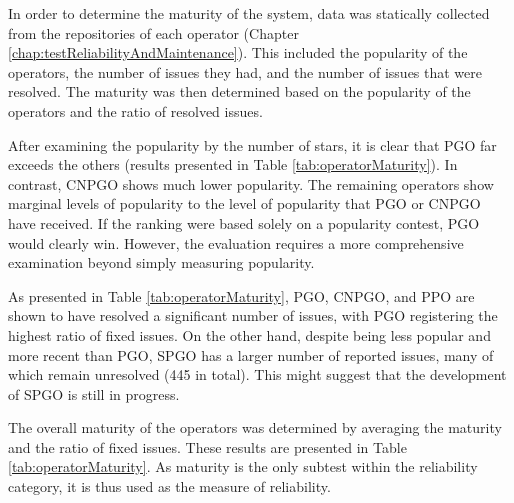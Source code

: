 
In order to determine the maturity of the system, data was statically collected from the repositories of each operator (Chapter \ref{chap:testReliabilityAndMaintenance}).
This included the popularity of the operators, the number of issues they had, and the number of issues that were resolved.
The maturity was then determined based on the popularity of the operators and the ratio of resolved issues.

After examining the popularity by the number of stars, it is clear that PGO far exceeds the others (results presented in Table \ref{tab:operatorMaturity}). In contrast, CNPGO shows much lower popularity.
The remaining operators show marginal levels of popularity to the level of popularity that PGO or CNPGO have received.
If the ranking were based solely on a popularity contest, PGO would clearly win. However, the evaluation requires a more comprehensive examination beyond simply measuring popularity.

As presented in Table \ref{tab:operatorMaturity}, PGO, CNPGO, and PPO are shown to have resolved a significant number of issues, with PGO registering the highest ratio of fixed issues. On the other hand, despite being less popular and more recent than PGO, SPGO has a larger number of reported issues, many of which remain unresolved (445 in total). This might suggest that the development of SPGO is still in progress.

The overall maturity of the operators was determined by averaging the maturity and the ratio of fixed issues.
These results are presented in Table \ref{tab:operatorMaturity}.
As maturity is the only subtest within the reliability category, it is thus used as the measure of reliability.

